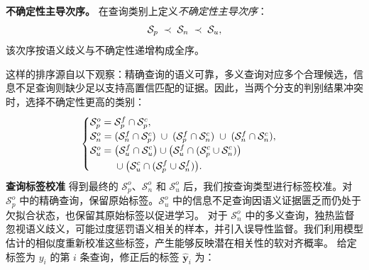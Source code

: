 \begin{definition}\textbf{不确定性主导次序。}
\label{def:uncertainty_order}
在查询类别上定义\emph{不确定性主导次序}：
\vspace{-.6em}
\begin{equation}
    \mathcal{S}_p \;\prec\; \mathcal{S}_n \;\prec\; \mathcal{S}_u ,
    \vspace{-.6em}
\end{equation}
该次序按语义歧义与不确定性递增构成全序。
\vspace{-.5em}
\end{definition}
这样的排序源自以下观察：精确查询的语义可靠，多义查询对应多个合理候选，信息不足查询则缺少足以支持高置信匹配的证据。因此，当两个分支的判别结果冲突时，选择不确定性更高的类别：
\vspace{-.6em}
\begin{equation}
\begin{cases}
\mathcal{S}^o_p = \mathcal{S}_p^f \cap \mathcal{S}_p^c, \\
\mathcal{S}^o_n = (\mathcal{S}_n^f \cap \mathcal{S}_p^c)
               \;\cup\; (\mathcal{S}_p^f \cap \mathcal{S}_n^c)
               \;\cup\; (\mathcal{S}_n^f \cap \mathcal{S}_n^c), \\
\mathcal{S}^o_u= \begin{aligned}[t]
  & \bigl(\mathcal{S}_u^f \cap \mathcal{S}_u^c\bigr) \cup \bigl(\mathcal{S}_u^f \cap (\mathcal{S}_p^c \cup \mathcal{S}_n^c)\bigr) \\
  & \cup \bigl( \mathcal{S}_u^c \cap (\mathcal{S}_p^f \cup \mathcal{S}_n^f)\bigr). \\
\end{aligned}
\end{cases}
\label{eq:influence_fusion}
\vspace{-.6em}
\end{equation}
\noindent \textbf{查询标签校准} \quad
得到最终的 $\mathcal{S}^o_p$、$\mathcal{S}^o_n$ 和 $\mathcal{S}^o_u$ 后，我们按查询类型进行标签校准。对 $\mathcal{S}^o_p$ 中的精确查询，保留原始标签。$\mathcal{S}^o_u$ 中的信息不足查询因语义证据匮乏而仍处于欠拟合状态，也保留其原始标签以促进学习。
对于 $\mathcal{S}^o_n$ 中的多义查询，独热监督忽视语义歧义，可能过度惩罚语义相关的样本，并引入误导性监督。我们利用模型估计的相似度重新校准这些标签，产生能够反映潜在相关性的软对齐概率。
给定标签为 $y_i$ 的第 $i$ 条查询，修正后的标签 $\hat{\boldsymbol{y}}_i$ 为：
